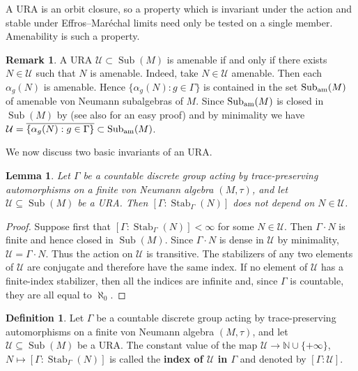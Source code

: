 \documentclass[12pt]{amsart} %
\theoremstyle{plain}
\newtheorem{lemma}[theorem]{Lemma}
\theoremstyle{definition}
\newtheorem{definition}[theorem]{Definition}
\newtheorem{remark}[theorem]{Remark}
\newcommand{\N}{\mathbb{N}}
\newcommand{\Ucal}{\mathcal{U}}
\DeclareMathOperator{\Sub}{Sub}
\begin{document}
\noindent A URA is an orbit closure, so a property which is invariant under the
action and stable under Effros--Mar\'echal limits need only be tested on a single
member. Amenability is such a property.
\medskip


\begin{remark}\label{rmk-amenbale-URA}A URA $\mathcal{U}\subset\Sub(M)$ is amenable if and only if there exists $N\in\mathcal{U}$ such that $N$ is amenable. Indeed, take $N\in\Ucal$ amenable. Then each $\alpha_g(N)$ is amenable. Hence $\{\alpha_g(N):g\in\Gamma\}$ is contained in the set $\Sub_{{\rm am}}(M)$ of amenable von Neumann subalgebras of $M$. Since $\Sub_{{\rm am}}(M)$ is closed in $\Sub(M)$
by \cite[Proposition~4.7]{THO25} (see also
\cite[Proposition 5.2]{fima2026spacesucpmapssubalgebras} for an easy proof) and by minimality we have $\Ucal=\overline{\{\alpha_g(N):g\in\Gamma\}}\subset\Sub_{{\rm am}}(M)$.
\end{remark}
\noindent We now discuss two basic invariants of an URA.
\begin{lemma}\label{lem:group-index-of-ura}
Let $\Gamma$ be a countable discrete group acting by trace-preserving
automorphisms on a finite von Neumann algebra $(M,\tau)$, and let
$\mathcal U\subseteq\Sub(M)$ be a URA. Then $[\Gamma:\operatorname{Stab}_\Gamma(N)]$
does not depend on $N\in\mathcal U$.
\end{lemma}
\begin{proof}
Suppose first that
$[\Gamma:\operatorname{Stab}_\Gamma(N)]<\infty$ for some
$N\in\mathcal U$. Then $\Gamma\cdot N$ is finite and hence closed in
$\Sub(M)$. Since $\Gamma\cdot N$ is dense in $\mathcal U$ by minimality, $
\mathcal U=\Gamma\cdot N$. Thus the action on $\mathcal U$ is transitive. The stabilizers of any two
elements of $\mathcal U$ are conjugate and therefore have the same index.
If no element of $\mathcal U$ has a finite-index stabilizer, then all the
indices are infinite and, since $\Gamma$ is countable, they are all equal
to $\aleph_0$.
\end{proof}
\begin{definition}\label{def:group-index-of-ura}
Let $\Gamma$ be a countable discrete group acting by trace-preserving
automorphisms on a finite von Neumann algebra $(M,\tau)$, and let
$\mathcal U\subseteq\Sub(M)$ be a URA. The constant value of the map $\Ucal\to\N\cup\{+\infty\}$, $N\mapsto [\Gamma:\operatorname{Stab}_\Gamma(N)]$ is called the
\textbf{index of $\mathcal U$ in $\Gamma$} and denoted by $
[\Gamma:\mathcal U]$.
\end{definition}
\end{document}

